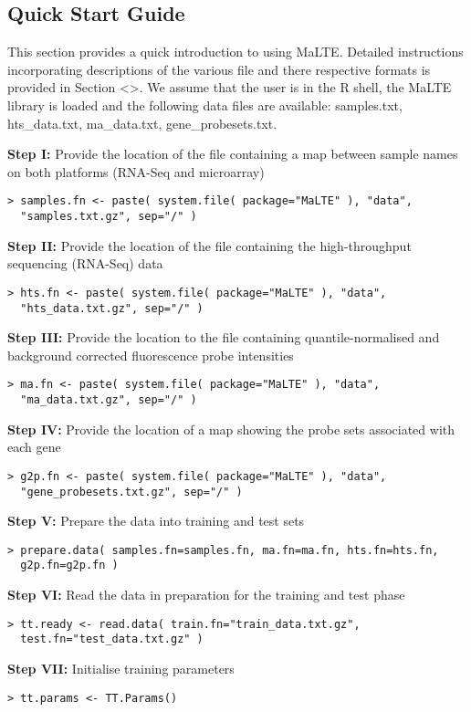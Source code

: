 \documentclass[a4paper,12pt]{article}
\begin{document}
\subsection{Quick Start Guide}
\label{gep:quick}
This section provides a quick introduction to using MaLTE. Detailed instructions incorporating descriptions of the various file and there respective formats is provided in Section \textless\textgreater. We assume that the user is in the R shell, the MaLTE library is loaded and the following data files are available: samples.txt, hts\_data.txt, ma\_data.txt, gene\_probesets.txt.


\textbf{Step I:} Provide the location of the file containing a map between sample names on both platforms (RNA-Seq and microarray)
\begin{verbatim}
> samples.fn <- paste( system.file( package="MaLTE" ), "data", 
  "samples.txt.gz", sep="/" )
\end{verbatim}
\textbf{Step II:} Provide the location of the file containing the high-throughput sequencing (RNA-Seq) data
\begin{verbatim}
> hts.fn <- paste( system.file( package="MaLTE" ), "data", 
  "hts_data.txt.gz", sep="/" )
\end{verbatim}
\textbf{Step III:} Provide the location to the file containing quantile-normalised and background corrected fluorescence probe intensities
\begin{verbatim}
> ma.fn <- paste( system.file( package="MaLTE" ), "data", 
  "ma_data.txt.gz", sep="/" )
\end{verbatim}
\textbf{Step IV:} Provide the location of a map showing the probe sets associated with each gene
\begin{verbatim}
> g2p.fn <- paste( system.file( package="MaLTE" ), "data", 
  "gene_probesets.txt.gz", sep="/" )
\end{verbatim}
\textbf{Step V:} Prepare the data into training and test sets
\begin{verbatim}
> prepare.data( samples.fn=samples.fn, ma.fn=ma.fn, hts.fn=hts.fn, 
  g2p.fn=g2p.fn )
\end{verbatim}
\textbf{Step VI:} Read the data in preparation for the training and test phase
\begin{verbatim}
> tt.ready <- read.data( train.fn="train_data.txt.gz", 
  test.fn="test_data.txt.gz" )
\end{verbatim}
\textbf{Step VII:} Initialise training parameters
\begin{verbatim}
> tt.params <- TT.Params()
\end{verbatim}
\end{document}
